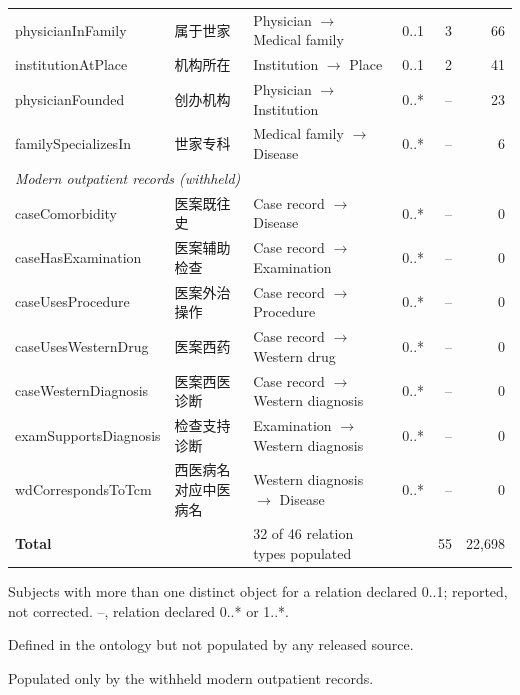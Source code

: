 \begin{table}[p]
\begin{threeparttable}
\begin{tabularx}{\linewidth}{llXlrr}
physicianInFamily & 属于世家 & Physician $\rightarrow$ Medical family & 0..1 & 3 & 66 \\
institutionAtPlace & 机构所在 & Institution $\rightarrow$ Place & 0..1 & 2 & 41 \\
physicianFounded & 创办机构 & Physician $\rightarrow$ Institution & 0..* & -- & 23 \\
familySpecializesIn & 世家专科 & Medical family $\rightarrow$ Disease & 0..* & -- & 6 \\
\multicolumn{6}{l}{\textit{Modern outpatient records (withheld) \textdaggerdbl{}}} \\
caseComorbidity & 医案既往史 & Case record $\rightarrow$ Disease & 0..* & -- & 0 \\
caseHasExamination & 医案辅助检查 & Case record $\rightarrow$ Examination & 0..* & -- & 0 \\
caseUsesProcedure & 医案外治操作 & Case record $\rightarrow$ Procedure & 0..* & -- & 0 \\
caseUsesWesternDrug & 医案西药 & Case record $\rightarrow$ Western drug & 0..* & -- & 0 \\
caseWesternDiagnosis & 医案西医诊断 & Case record $\rightarrow$ Western diagnosis & 0..* & -- & 0 \\
examSupportsDiagnosis & 检查支持诊断 & Examination $\rightarrow$ Western diagnosis & 0..* & -- & 0 \\
wdCorrespondsToTcm & 西医病名对应中医病名 & Western diagnosis $\rightarrow$ Disease & 0..* & -- & 0 \\
\textbf{Total} &  & 32 of 46 relation types populated &  & 55 & 22,698 \\
\bottomrule
\end{tabularx}
\begin{tablenotes}\footnotesize
\item * Subjects with more than one distinct object for a relation declared 0..1; reported, not corrected. --, relation declared 0..* or 1..*.
\item \textdagger{} Defined in the ontology but not populated by any released source.
\item \textdaggerdbl{} Populated only by the withheld modern outpatient records.
\end{tablenotes}
\end{threeparttable}
\end{table}

